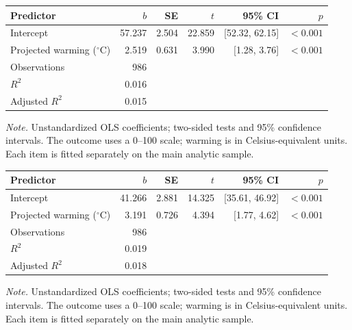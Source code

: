 \documentclass[11pt,a4paper]{article}
\begin{document}
\begingroup\small
\begin{tabularx}{\textwidth}{@{}Xrrrrr@{}}
\toprule
Predictor & $b$ & SE & $t$ & 95\% CI & $p$ \\
\midrule
Intercept & 57.237 & 2.504 & 22.859 & [52.32, 62.15] & $<0.001$ \\
Projected warming ($^\circ$C) & 2.519 & 0.631 & 3.990 & [1.28, 3.76] & $<0.001$ \\
Observations & 986 &  &  &  &  \\
$R^2$ & 0.016 &  &  &  &  \\
Adjusted $R^2$ & 0.015 &  &  &  &  \\
\bottomrule\end{tabularx}
\par\smallskip
{\footnotesize\textit{Note.} Unstandardized OLS coefficients; two-sided tests and 95\% confidence intervals. The outcome uses a 0--100 scale; warming is in Celsius-equivalent units. Each item is fitted separately on the main analytic sample.\par}
\endgroup\bigskip
{}\label{tab:10}
\begingroup\small
\begin{tabularx}{\textwidth}{@{}Xrrrrr@{}}
\toprule
Predictor & $b$ & SE & $t$ & 95\% CI & $p$ \\
\midrule
Intercept & 41.266 & 2.881 & 14.325 & [35.61, 46.92] & $<0.001$ \\
Projected warming ($^\circ$C) & 3.191 & 0.726 & 4.394 & [1.77, 4.62] & $<0.001$ \\
Observations & 986 &  &  &  &  \\
$R^2$ & 0.019 &  &  &  &  \\
Adjusted $R^2$ & 0.018 &  &  &  &  \\
\bottomrule\end{tabularx}
\par\smallskip
{\footnotesize\textit{Note.} Unstandardized OLS coefficients; two-sided tests and 95\% confidence intervals. The outcome uses a 0--100 scale; warming is in Celsius-equivalent units. Each item is fitted separately on the main analytic sample.\par}
\endgroup\bigskip
\clearpage
{}\label{tab:11}
\begingroup\small
\end{document}
